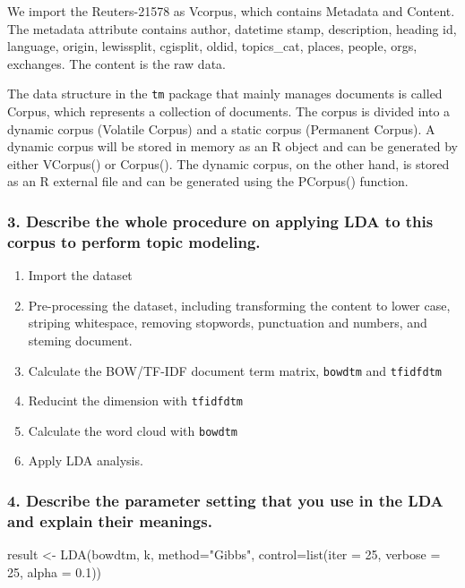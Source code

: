 \documentclass[
]{article}
\newenvironment{Shaded}{}{}
\newcommand{\AttributeTok}[1]{\textcolor[rgb]{0.49,0.56,0.16}{#1}}
\newcommand{\DecValTok}[1]{\textcolor[rgb]{0.25,0.63,0.44}{#1}}
\newcommand{\FloatTok}[1]{\textcolor[rgb]{0.25,0.63,0.44}{#1}}
\newcommand{\FunctionTok}[1]{\textcolor[rgb]{0.02,0.16,0.49}{#1}}
\newcommand{\NormalTok}[1]{#1}
\newcommand{\OtherTok}[1]{\textcolor[rgb]{0.00,0.44,0.13}{#1}}
\newcommand{\StringTok}[1]{\textcolor[rgb]{0.25,0.44,0.63}{#1}}
\begin{document}
We import the Reuters-21578 as Vcorpus, which contains Metadata and
Content. The metadata attribute contains author, datetime stamp,
description, heading id, language, origin, lewissplit, cgisplit, oldid,
topics\_cat, places, people, orgs, exchanges. The content is the raw
data.

The data structure in the \texttt{tm} package that mainly manages
documents is called Corpus, which represents a collection of documents.
The corpus is divided into a dynamic corpus (Volatile Corpus) and a
static corpus (Permanent Corpus). A dynamic corpus will be stored in
memory as an R object and can be generated by either VCorpus() or
Corpus(). The dynamic corpus, on the other hand, is stored as an R
external file and can be generated using the PCorpus() function.

\hypertarget{header-n10}{%
\subsubsection{3. Describe the whole procedure on applying LDA to this
corpus to perform topic modeling.}\label{header-n10}}

\begin{enumerate}
\def\labelenumi{\arabic{enumi}.}
\item
  Import the dataset
\item
  Pre-processing the dataset, including transforming the content to
  lower case, striping whitespace, removing stopwords, punctuation and
  numbers, and steming document.
\item
  Calculate the BOW/TF-IDF document term matrix, \texttt{bowdtm} and
  \texttt{tfidfdtm}
\item
  Reducint the dimension with \texttt{tfidfdtm}
\item
  Calculate the word cloud with \texttt{bowdtm}
\item
  Apply LDA analysis.
\end{enumerate}

\hypertarget{header-n25}{%
\subsubsection{4. Describe the parameter setting that you use in the LDA
and explain their meanings.}\label{header-n25}}

\begin{Shaded}
\begin{Highlighting}[]
\NormalTok{result }\OtherTok{\textless{}{-}} \FunctionTok{LDA}\NormalTok{(bowdtm, k, }\AttributeTok{method=}\StringTok{"Gibbs"}\NormalTok{, }\AttributeTok{control=}\FunctionTok{list}\NormalTok{(}\AttributeTok{iter =} \DecValTok{25}\NormalTok{, }\AttributeTok{verbose =} \DecValTok{25}\NormalTok{, }\AttributeTok{alpha =} \FloatTok{0.1}\NormalTok{))}
\end{Highlighting}
\end{Shaded}
\end{document}
